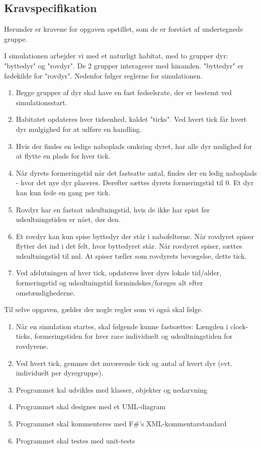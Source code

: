 \documentclass[a4paper]{article}
\begin{document}
  \subsection{Kravspecifikation} \label{ssec:demands}
    Herunder er kravene for opgaven opstillet, som de er forstået af undertegnede gruppe.

    I simulationen arbejder vi med et naturligt habitat,
    med to grupper dyr: "byttedyr" og "rovdyr". De 2 grupper interagerer med 
    hinanden. "byttedyr" er fødekilde for "rovdyr".
    Nedenfor følger reglerne for simulationen.

    \begin{enumerate}
      \item Begge grupper af dyr skal have en fast fødselsrate, der er bestemt ved simulationsstart.
      \item Habitatet opdateres hver tidsenhed, kaldet "ticks". Ved hvert tick får hvert dyr mulgighed for at udføre en handling.
      \item Hvis der findes en ledige naboplads omkring dyret, har alle dyr mulighed for at flytte en plads for hver tick.
      \item Når dyrets formeringstid når det fastsatte antal, findes der en ledig naboplads - hvor det nye dyr placeres. Derefter sættes dyrets formeringstid til 0. Et dyr kan kun føde en gang per tick.
      \item Rovdyr har en fastsat udsultningstid, hvis de ikke har spist før udsultningstiden er nået, dør den.
      \item Et rovdyr kan kun spise byttedyr der står i nabofelterne. Når rovdyret spiser flytter det ind i det felt, hvor byttedyret står. Når rovdyret spiser, sættes udsultningstid til nul. At spiser tæller som rovdyrets bevægelse, dette tick.
      \item Ved afslutningen af hver tick, opdateres hver dyrs lokale tid/alder, formeringstid og udsultningstid formindskes/forøges alt efter omstændighederne.
    \end{enumerate}
    
    Til selve opgaven, gælder der nogle regler som vi også skal følge.
    \begin{enumerate}
      \item Når en simulation startes, skal følgende kunne fastsættes: Længden i clock-ticks, formeringstiden for hver race individuelt og udsultningstiden for rovdyrene.
      \item Ved hvert tick, gemmes det nuværende tick og antal af hvert dyr (evt. individuelt per dyregruppe).
      \item Programmet kal udvikles med klasser, objekter og nedarvning
      \item Programmet skal designes med et UML-diagram
      \item Programmet skal kommenteres med F\#'s XML-kommentarstandard
      \item Programmet skal testes med unit-tests
    \end{enumerate}
\end{document}
